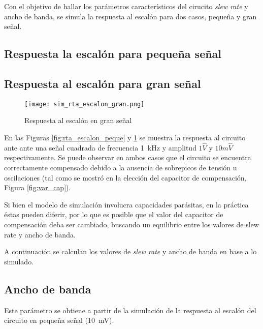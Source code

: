 	Con el objetivo de hallar los parámetros característicos del cirucito \textit{slew rate} y ancho de banda, se simula la respuesta al escalón para dos casos, pequeña y gran señal.

\subsection{Respuesta la escalón para pequeña señal}


\subsection{Respuesta al escalón para gran señal}

\begin{figure}[H]
	\centering
	\texttt{[image: sim\_rta\_escalon\_gran.png]}
	\caption{Respuesta al escalón en gran señal}
	\label{fig:rta_escalon_gran}
\end{figure}

	En las Figuras \ref{fig:rta_escalon_peque} y \ref{fig:rta_escalon_gran} se muestra la respuesta al circuito ante ante una señal cuadrada de frecuencia \SI{1}{\kilo\hertz} y amplitud $1\hat{V}$ y $10m\hat{V}$ respectivamente. Se puede observar en ambos casos que el circuito se encuentra correctamente compensado debido a la ausencia de sobrepicos de tensión u oscilaciones (tal como se mostró en la elección del capacitor de compensación, Figura \ref{fig:var_cap}). 
	
	Si bien el modelo de simulación involucra capacidades parásitas, en la práctica éstas pueden diferir, por lo que es posible que el valor del capacitor de compensación deba ser cambiado, buscando un equilibrio entre los valores de  slew rate y ancho de banda.
	
	A continuación se calculan los valores de \textit{slew rate} y ancho de banda en base a lo simulado.
\subsection{Ancho de banda}

	Este parámetro se obtiene a partir de la simulación de la respuesta al escalón del circuito en pequeña señal (\SI{10}{\milli\volt}).
	


